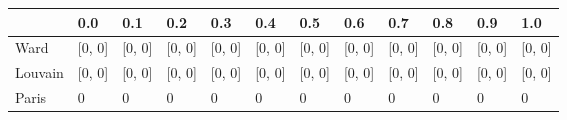 \begin{tabular}{llllllllllll}
\toprule
{} &     0.0 &     0.1 &     0.2 &     0.3 &     0.4 &     0.5 &     0.6 &     0.7 &     0.8 &     0.9 &     1.0 \\
\midrule
Ward    &  [0, 0] &  [0, 0] &  [0, 0] &  [0, 0] &  [0, 0] &  [0, 0] &  [0, 0] &  [0, 0] &  [0, 0] &  [0, 0] &  [0, 0] \\
Louvain &  [0, 0] &  [0, 0] &  [0, 0] &  [0, 0] &  [0, 0] &  [0, 0] &  [0, 0] &  [0, 0] &  [0, 0] &  [0, 0] &  [0, 0] \\
Paris   &       0 &       0 &       0 &       0 &       0 &       0 &       0 &       0 &       0 &       0 &       0 \\
\bottomrule
\end{tabular}

